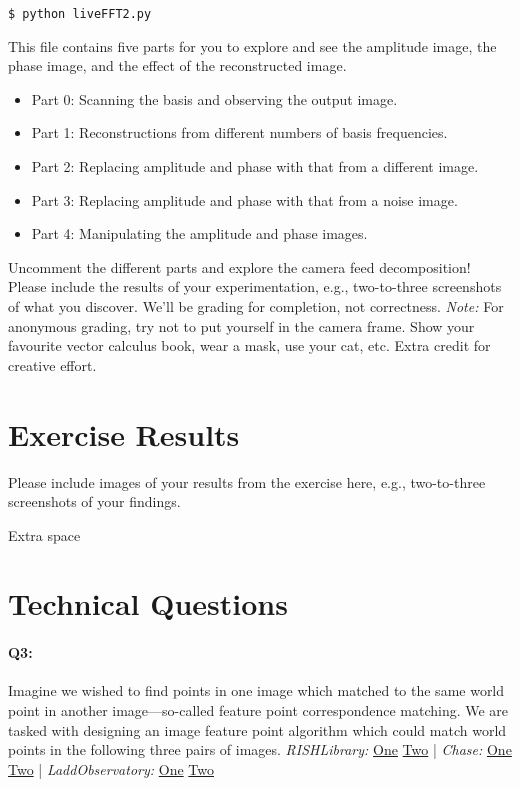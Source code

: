 \begin{verbatim}
$ python liveFFT2.py
\end{verbatim}

This file contains five parts for you to explore and see the amplitude image, the phase image, and the effect of the reconstructed image.
\begin{itemize}
    \item Part 0: Scanning the basis and observing the output image.
    \item Part 1: Reconstructions from different numbers of basis frequencies.
    \item Part 2: Replacing amplitude and phase with that from a different image.
    \item Part 3: Replacing amplitude and phase with that from a noise image.
    \item Part 4: Manipulating the amplitude and phase images.
\end{itemize}

Uncomment the different parts and explore the camera feed decomposition! Please include the results of your experimentation, e.g., two-to-three screenshots of what you discover. We'll be grading for completion, not correctness. \emph{Note:} For anonymous grading, try not to put yourself in the camera frame. Show your favourite vector calculus book, wear a mask, use your cat, etc. Extra credit for creative effort.


\pagebreak
\section*{Exercise Results}
Please include images of your results from the exercise here, e.g., two-to-three screenshots of your findings.




\pagebreak
Extra space





\pagebreak
\section*{Technical Questions}

\paragraph{Q3:} Imagine we wished to find points in one image which matched to the same world point in another image---so-called feature point correspondence matching. We are tasked with designing an image feature point algorithm which could match world points in the following three pairs of images.
\newline
\newline
\emph{RISHLibrary:} \href{RISHLibrary1.jpg}{One} \href{RISHLibrary2.jpg}{Two} | \emph{Chase:} \href{Chase1.jpg}{One} \href{Chase2.jpg}{Two} | \emph{LaddObservatory:} \href{LaddObservatory1.jpg}{One} \href{LaddObservatory2.jpg}{Two}

